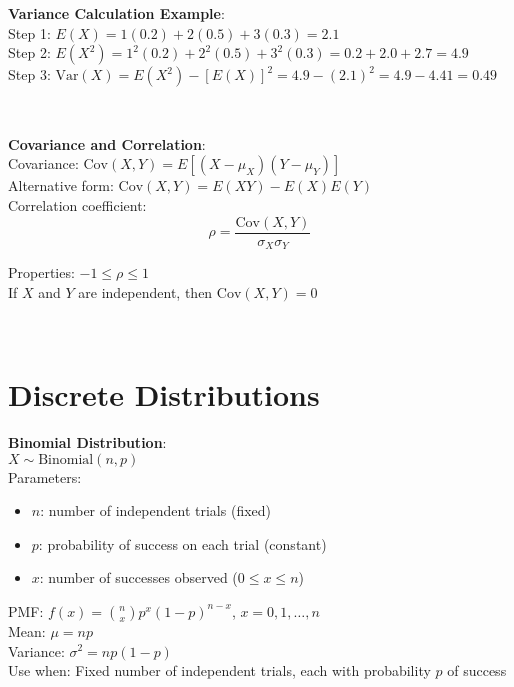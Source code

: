 \documentclass{article}
\newenvironment{cheatformula}[1][Title]{
    \begin{minipage}{\linewidth}
    \textbf{#1}:\\
}{
    \end{minipage}\\[2ex]
}
\begin{document}
\begin{multicols*}{2}
\begin{cheatformula}[Variance Calculation Example]
    Step 1: $E(X) = 1(0.2) + 2(0.5) + 3(0.3) = 2.1$\\
    Step 2: $E(X^2) = 1^2(0.2) + 2^2(0.5) + 3^2(0.3) = 0.2 + 2.0 + 2.7 = 4.9$\\
    Step 3: $\text{Var}(X) = E(X^2) - [E(X)]^2 = 4.9 - (2.1)^2 = 4.9 - 4.41 = 0.49$
\end{cheatformula}

\begin{cheatformula}[Covariance and Correlation]
    Covariance: $\text{Cov}(X,Y) = E[(X-\mu_X)(Y-\mu_Y)]$\\
    Alternative form: $\text{Cov}(X,Y) = E(XY) - E(X)E(Y)$\\
    
    Correlation coefficient:
    $$\rho = \frac{\text{Cov}(X,Y)}{\sigma_X \sigma_Y}$$
    
    Properties: $-1 \leq \rho \leq 1$\\
    If $X$ and $Y$ are independent, then $\text{Cov}(X,Y) = 0$
\end{cheatformula}

\section{Discrete Distributions}

\begin{cheatformula}[Binomial Distribution]
    $X \sim \text{Binomial}(n,p)$\\
    Parameters:
    \begin{itemize}
        \item $n$: number of independent trials (fixed)
        \item $p$: probability of success on each trial (constant)
        \item $x$: number of successes observed ($0 \leq x \leq n$)
    \end{itemize}
    PMF: $f(x) = \binom{n}{x}p^x(1-p)^{n-x}$, $x = 0,1,\ldots,n$\\
    Mean: $\mu = np$\\
    Variance: $\sigma^2 = np(1-p)$\\
    
    Use when: Fixed number of independent trials, each with probability $p$ of success
\end{cheatformula}


\end{multicols*}
\end{document}
